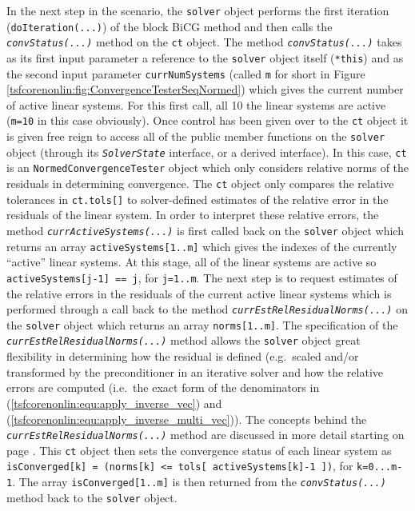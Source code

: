 In the next step in the scenario, the \texttt{solver} object performs
the first iteration (\texttt{do\-Iteration(\-...)}) of the block BiCG method
and then calls the \texttt{\textit{convStatus(...)}} method on the
\texttt{ct} object.  The method \texttt{\textit{convStatus(...)}}
takes as its first input parameter a reference to the \texttt{solver}
object itself (\texttt{*this}) and as the second input parameter
\texttt{currNumSystems} (called
\texttt{m} for short in Figure
\ref{tsfcorenonlin:fig:ConvergenceTesterSeqNormed}) which gives the current number
of active linear systems.  For this first call, all 10 the linear
systems are active (\texttt{m=10} in this case obviously).  Once
control has been given over to the \texttt{ct} object it is given free
reign to access all of the public member functions on the
\texttt{solver} object (through its \texttt{\textit{Solver\-State}}
interface, or a derived interface).  In this case, \texttt{ct} is an
\texttt{NormedConvergenceTester} object which only considers relative
norms of the residuals in determining convergence.  The \texttt{ct}
object only compares the relative tolerances in \texttt{ct.tols[]} to
solver-defined estimates of the relative error in the residuals of the
linear system.  In order to interpret these relative errors, the method
\texttt{\textit{currActiveSystems(...)}} is first called back on the
\texttt{solver} object which returns an array \texttt{activeSystems[1..m]}
which gives the indexes of the currently ``active'' linear systems.
At this stage, all of the linear systems are active so
\texttt{activeSystems[j-1] == j}, for
\texttt{j=1..m}.  The next step is to request estimates of the
relative errors in the residuals of the current active linear systems
which is performed through a call back to the method
\texttt{\textit{curr\-Est\-Rel\-Residual\-Norms(...)}} on the \texttt{solver} object
which returns an array \texttt{norms[1..m]}.  The specification of the
\texttt{\textit{curr\-Est\-Rel\-Residual\-Norms(...)}}  method allows the
\texttt{solver} object great flexibility in determining how the
residual is defined (e.g.~scaled and/or transformed by the
preconditioner in an iterative solver and how the
relative errors are computed (i.e.~the exact form of the denominators
in (\ref{tsfcorenonlin:equ:apply_inverse_vec}) and
(\ref{tsfcorenonlin:equ:apply_inverse_multi_vec})).  The concepts
behind the \texttt{\textit{curr\-Est\-Rel\-Residual\-Norms(...)}}
method are discussed in more detail starting on page
\pageref{tsfcorenonlin:sec:solver_defined_rel_err}.  This \texttt{ct}
object then sets the convergence status of each linear system as
\texttt{isConverged[k] = (norms[k] <= tols[ active\-Systems[k]-1 ])},
for \texttt{k=0...m-1}.  The array \texttt{isConverged[1..m]} is then
returned from the \texttt{\textit{convStatus(...)}} method back to the
\texttt{solver} object.


